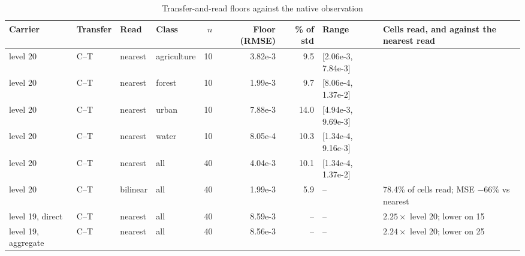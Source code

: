\begin{table}[t]
\centering
\caption{Transfer-and-read floors against the native observation}
\label{tab:floors}
\footnotesize
\setlength{\tabcolsep}{4pt}
\begin{tabular}{@{}llllrrrll@{}}
\toprule
Carrier & Transfer & Read & Class & $n$ & Floor (RMSE) & \% of std & Range & Cells read, and against the nearest read \\
\midrule
level 20 & C--T & nearest & agriculture & 10 & 3.82e-3 & 9.5 & [2.06e-3, 7.84e-3] & \\
level 20 & C--T & nearest & forest & 10 & 1.99e-3 & 9.7 & [8.06e-4, 1.37e-2] & \\
level 20 & C--T & nearest & urban & 10 & 7.88e-3 & 14.0 & [4.94e-3, 9.69e-3] & \\
level 20 & C--T & nearest & water & 10 & 8.05e-4 & 10.3 & [1.34e-4, 9.16e-3] & \\
level 20 & C--T & nearest & all & 40 & 4.04e-3 & 10.1 & [1.34e-4, 1.37e-2] & \\
\midrule
level 20 & C--T & bilinear & all & 40 & 1.99e-3 & 5.9 & -- & 78.4\% of cells read; MSE $-66\%$ vs nearest \\
\midrule
level 19, direct & C--T & nearest & all & 40 & 8.59e-3 & -- & -- & $2.25\times$ level 20; lower on 15 \\
level 19, aggregate & C--T & nearest & all & 40 & 8.56e-3 & -- & -- & $2.24\times$ level 20; lower on 25 \\
\bottomrule
\end{tabular}
\end{table}
